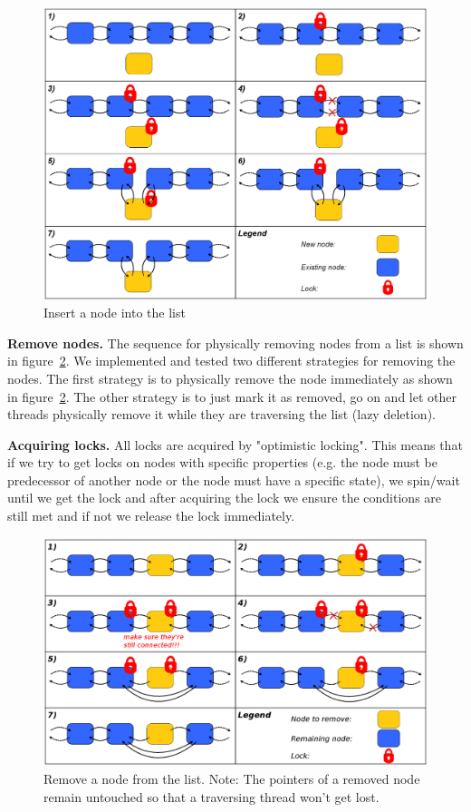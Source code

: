 \documentclass[letterpaper]{article}
\newcommand{\mypar}[1]{{\bf #1.}}
\begin{document}
\begin{figure}[h]\centering
  \includegraphics[scale=0.31]{insert.eps}
  \caption{Insert a node into the list \label{fig:insert}}
\end{figure}

\mypar{Remove nodes}
The sequence for physically removing nodes from a list is shown in  figure~\ref{fig:remove}. We implemented and tested two different strategies for removing the nodes. The first strategy is to physically remove the node immediately as shown in figure~\ref{fig:remove}. The other strategy is to just mark it as removed, go on and let other threads physically remove it while they are traversing the list (lazy deletion).

\mypar{Acquiring locks}
All locks are acquired by "optimistic locking". This means that if we try to get locks on nodes with specific properties (e.g. the node must be predecessor of another node or the node must have a specific state), we spin/wait until we get the lock and after acquiring the lock we ensure the conditions are still met and if not we release the lock immediately.

\begin{figure}[h]\centering
  \includegraphics[scale=0.31]{remove.eps}
  \caption{Remove a node from the list. Note: The pointers of a removed node remain untouched so that a traversing thread won't get lost. \label{fig:remove}}
\end{figure}
\end{document}
